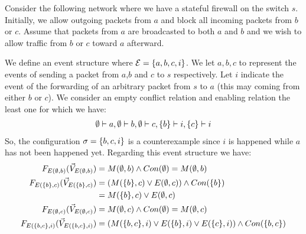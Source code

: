 \begin{example}
\end{example}

\begin{example}
    Consider the following network where we have
    a stateful firewall on the switch $s$.
    Initially, we allow outgoing packets from $a$ and
    block all incoming packets from $b$ or $c$.
    Assume that packets from $a$ are broadcasted to
    both $a$ and $b$ and we wish to allow traffic
    from $b$ or $c$ toward $a$ afterward.
    \begin{center}
    \end{center}
    We define an event structure where
    $\mathcal{E} = \{a,b,c,i\}$.
    We let $a,b,c$ to represent the events of sending
    a packet from $a$,$b$ and $c$ to $s$ respectively.
    Let $i$ indicate the event of the forwarding of
    an arbitrary packet from $s$ to $a$ (this may coming
    from either $b$ or $c$).
    We consider an empty conflict relation and enabling
    relation the least one for which we have:
    \begin{align*}
        \emptyset \vdash a,\emptyset \vdash b, \emptyset \vdash c,
        \{b\} \vdash i, \{c\} \vdash i
    \end{align*}
    So, the configuration $\sigma = \{b,c,i\}$ is a
    counterexample since $i$ is happened while $a$
    has not been happened yet.
    Regarding this event structure we have:
    \begin{align*}
        \f{E(\e,b)}      & = M(\e,b) \wedge Con(\e) = M(\e,b)                                   \\
        \f{E(\s{b},c)}   & = (M(\s{b},c) \vee E(\e,c)) \wedge Con(\s{b})                        \\
                         & = M(\s{b},c) \vee E(\e,c)                                            \\
        \f{E(\e,c)}      & = M(\e,c) \wedge Con(\e)  = M(\e,c)                                  \\
        \f{E(\s{b,c},i)} & = (M(\s{b,c},i) \vee E(\s{b},i) \vee E(\s{c},i))
        \wedge Con(\s{b,c})                                                                     \\

\end{align*}
\end{example}
